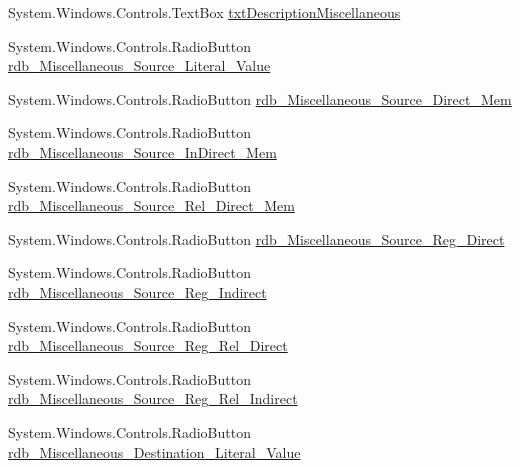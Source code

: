 \begin{DoxyCompactItemize}
\item 
System.\+Windows.\+Controls.\+Text\+Box \hyperlink{class_c_p_u___o_s___simulator_1_1_instructions_window_aaf938911ac6e23d7d637245cf40e6cbe}{txt\+Description\+Miscellaneous}
\item 
System.\+Windows.\+Controls.\+Radio\+Button \hyperlink{class_c_p_u___o_s___simulator_1_1_instructions_window_aba9f9a667eae008e2d9466edd3a6876a}{rdb\+\_\+\+Miscellaneous\+\_\+\+Source\+\_\+\+Literal\+\_\+\+Value}
\item 
System.\+Windows.\+Controls.\+Radio\+Button \hyperlink{class_c_p_u___o_s___simulator_1_1_instructions_window_a55badcfc8f7e9eba47cdd6b2dac29a7e}{rdb\+\_\+\+Miscellaneous\+\_\+\+Source\+\_\+\+Direct\+\_\+\+Mem}
\item 
System.\+Windows.\+Controls.\+Radio\+Button \hyperlink{class_c_p_u___o_s___simulator_1_1_instructions_window_adeba80e7d387a773f2bf209882618ce1}{rdb\+\_\+\+Miscellaneous\+\_\+\+Source\+\_\+\+In\+Direct\+\_\+\+Mem}
\item 
System.\+Windows.\+Controls.\+Radio\+Button \hyperlink{class_c_p_u___o_s___simulator_1_1_instructions_window_ad4a827d50d5fa5e0c8b07d64f03ba4ff}{rdb\+\_\+\+Miscellaneous\+\_\+\+Source\+\_\+\+Rel\+\_\+\+Direct\+\_\+\+Mem}
\item 
System.\+Windows.\+Controls.\+Radio\+Button \hyperlink{class_c_p_u___o_s___simulator_1_1_instructions_window_afcf24c1b752e705011fb524a512bb501}{rdb\+\_\+\+Miscellaneous\+\_\+\+Source\+\_\+\+Reg\+\_\+\+Direct}
\item 
System.\+Windows.\+Controls.\+Radio\+Button \hyperlink{class_c_p_u___o_s___simulator_1_1_instructions_window_a6220f9fa7865fa88f9542ac5b50ea69c}{rdb\+\_\+\+Miscellaneous\+\_\+\+Source\+\_\+\+Reg\+\_\+\+Indirect}
\item 
System.\+Windows.\+Controls.\+Radio\+Button \hyperlink{class_c_p_u___o_s___simulator_1_1_instructions_window_aaa3f3a1d1cdee533ce37ead1681e4786}{rdb\+\_\+\+Miscellaneous\+\_\+\+Source\+\_\+\+Reg\+\_\+\+Rel\+\_\+\+Direct}
\item 
System.\+Windows.\+Controls.\+Radio\+Button \hyperlink{class_c_p_u___o_s___simulator_1_1_instructions_window_ac304974d6bced435f3da9d17d0f0063f}{rdb\+\_\+\+Miscellaneous\+\_\+\+Source\+\_\+\+Reg\+\_\+\+Rel\+\_\+\+Indirect}
\item 
System.\+Windows.\+Controls.\+Radio\+Button \hyperlink{class_c_p_u___o_s___simulator_1_1_instructions_window_a7e018d18b040f8769b153abf35a839a9}{rdb\+\_\+\+Miscellaneous\+\_\+\+Destination\+\_\+\+Literal\+\_\+\+Value}
\item 

\end{DoxyCompactItemize}
